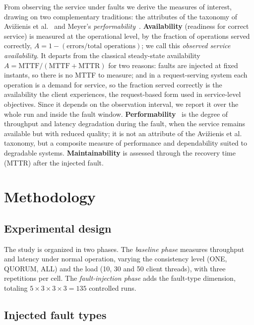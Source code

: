 \documentclass[runningheads]{llncs}
\begin{document}
From observing the service under faults we derive the measures of interest,
drawing on two complementary traditions: the attributes of the taxonomy of
Avi\v{z}ienis et al.~\cite{avizienis2004basic} and Meyer's
\emph{performability}~\cite{meyer1980}. \textbf{Availability} (readiness for
correct service) is measured at the operational level, by the fraction of
operations served correctly, $A = 1 - (\text{errors}/\text{total operations})$;
we call this \emph{observed service availability}. It departs from the classical
steady-state availability $A = \text{MTTF}/(\text{MTTF}+\text{MTTR})$ for two
reasons: faults are injected at fixed instants, so there is no MTTF to measure;
and in a request-serving system each operation is a demand for service, so the
fraction served correctly is the availability the client experiences, the
request-based form used in service-level objectives. Since it depends on the
observation interval, we report it over the whole run and inside the fault
window.
\textbf{Performability}~\cite{meyer1980} is the degree of throughput and latency
degradation during the fault, when the service remains available but with reduced
quality; it is not an attribute of the Avi\v{z}ienis et al. taxonomy, but a
composite measure of performance and dependability suited to degradable systems.
\textbf{Maintainability} is assessed through the recovery time (MTTR) after the
injected fault.

\section{Methodology}
\label{sec:methodology}

\subsection{Experimental design}

The study is organized in two phases. The \emph{baseline phase} measures
throughput and latency under normal operation, varying the consistency level
(ONE, QUORUM, ALL) and the load (10, 30 and 50 client threads), with three
repetitions per cell. The \emph{fault-injection phase} adds the fault-type
dimension, totaling $5 \times 3 \times 3 \times 3 = 135$ controlled runs.

\subsection{Injected fault types}
\end{document}
